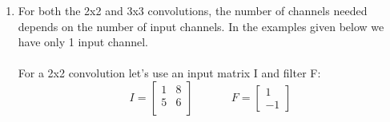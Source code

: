 \documentclass{article}
\begin{document}
\begin{enumerate} [label=\Alph*]
          Using a ReLU operation on the convolution, the output is: \\ \\
          $ conv(ReLU) = \begin{bmatrix}
              0 & 2 & 0 & 0 \\
              0 & 3 & 7 & 3 \\
              5 & 2 & 3 & 1
          \end{bmatrix}$, where every negative element of the conv matrix is turned to 0. 

          \vspace{0.8cm}
          In order to get the max-pooling output we need to add the output of the ReLU operation to the 3x4 matrix (starting from the second row of the initial input matrix I):\\ \\

          $max-pooled = \begin{bmatrix}
            0 & 2 & 0 & 0 \\
            0 & 3 & 7 & 3 \\
            5 & 2 & 3 & 1
          \end{bmatrix} + 
          \begin{bmatrix}
                5 & 6 & 18 & 20 \\
                7 & 3 & 11 & 17 \\
                2 & 1 & 8 & 16
          \end{bmatrix} \Rightarrow max-pooled = \begin{bmatrix}
              5 & 8 & 18 & 20 \\
              7 & 6 & 18 & 20 \\
              7 & 3 & 11 & 17
          \end{bmatrix}$

          \item 
          For both the 2x2 and 3x3 convolutions, the number of channels needed depends on the number of input channels. In the examples given below we have only 1 input channel.\\\\
          For a 2x2 convolution let's use an input matrix I and filter F: \\
          \[
            I = \begin{bmatrix}
                1 & 8\\
                5 & 6 \\
            \end{bmatrix}
            \quad
            \hspace{1cm}
            F = \begin{bmatrix}
                1 \\ -1
            \end{bmatrix} 
            \]


\end{enumerate}
\end{document}
